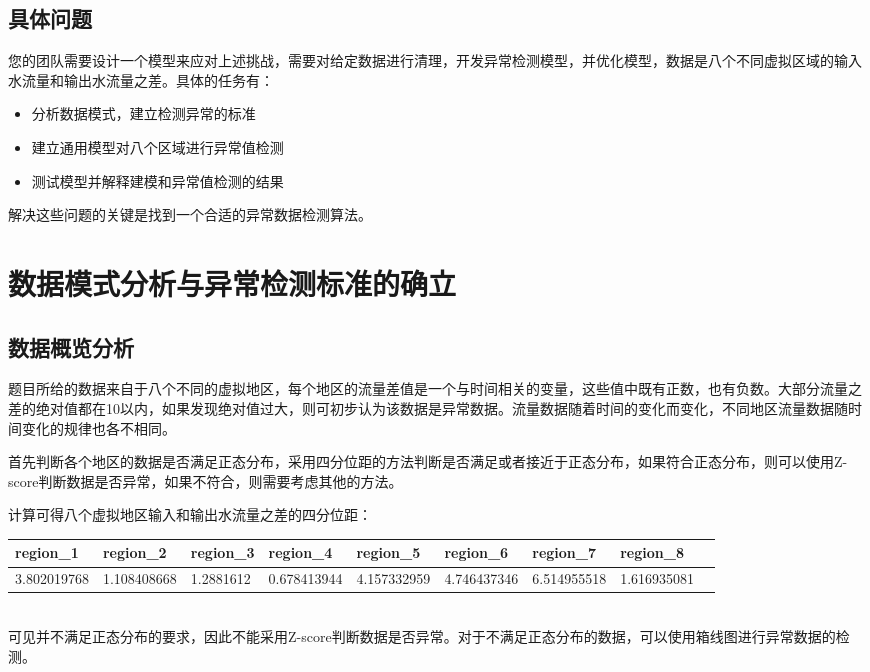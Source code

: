 \documentclass[UTF8]{article}
\begin{document}
		\subsection{具体问题}
		\par 您的团队需要设计一个模型来应对上述挑战，需要对给定数据进行清理，开发异常检测模型，并优化模型，数据是八个不同虚拟区域的输入水流量和输出水流量之差。具体的任务有：

		\begin{itemize}
			\item 分析数据模式，建立检测异常的标准
			\item 建立通用模型对八个区域进行异常值检测
			\item 测试模型并解释建模和异常值检测的结果
		\end{itemize}
		解决这些问题的关键是找到一个合适的异常数据检测算法。
	\section{数据模式分析与异常检测标准的确立}	
		\subsection{数据概览分析}
			\par 题目所给的数据来自于八个不同的虚拟地区，每个地区的流量差值是一个与时间相关的变量，这些值中既有正数，也有负数。大部分流量之差的绝对值都在10以内，如果发现绝对值过大，则可初步认为该数据是异常数据。流量数据随着时间的变化而变化，不同地区流量数据随时间变化的规律也各不相同。
			\par 首先判断各个地区的数据是否满足正态分布，采用四分位距的方法判断是否满足或者接近于正态分布，如果符合正态分布，则可以使用Z-score判断数据是否异常，如果不符合，则需要考虑其他的方法。
			\par 计算可得八个虚拟地区输入和输出水流量之差的四分位距：
			\begin{table}[!ht]
				\centering
				\resizebox{0.8\textwidth}{!}
				{
					\begin{tabular}{|l|l|l|l|l|l|l|l|l|}
					\hline
						region\_1 & region\_2 & region\_3 & region\_4 & region\_5 & region\_6 & region\_7 & region\_8 \\ \hline
						3.802019768 & 1.108408668 & 1.2881612 & 0.678413944 & 4.157332959 & 4.746437346 & 6.514955518 & 1.616935081 \\ \hline
					\end{tabular}
				}
			\end{table}
			\\可见并不满足正态分布的要求，因此不能采用Z-score判断数据是否异常。对于不满足正态分布的数据，可以使用箱线图进行异常数据的检测。
			\newpage
\end{document}
